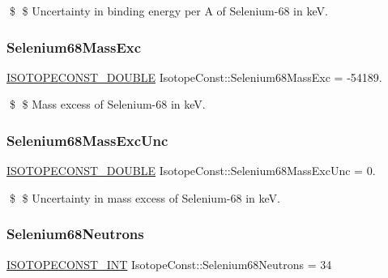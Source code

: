 \$ \$ Uncertainty in binding energy per A of Selenium-\/68 in keV. \mbox{\label{group___isotope_const-_selenium-_se68_ga8b3794abb817ae62775d8203038e5ab0}} 
\subsubsection{\texorpdfstring{Selenium68\+Mass\+Exc}{Selenium68MassExc}}
{\footnotesize\ttfamily \mbox{\hyperlink{group___isotope_const-_macros_ga8f45a7272ce02c0b4c65c44636ed719a}{I\+S\+O\+T\+O\+P\+E\+C\+O\+N\+S\+T\+\_\+\+D\+O\+U\+B\+LE}} Isotope\+Const\+::\+Selenium68\+Mass\+Exc = -\/54189.}

\$ \$ Mass excess of Selenium-\/68 in keV. \mbox{\label{group___isotope_const-_selenium-_se68_gaf2a722bd0616d2ed3c1ca0dd50732c0d}} 
\subsubsection{\texorpdfstring{Selenium68\+Mass\+Exc\+Unc}{Selenium68MassExcUnc}}
{\footnotesize\ttfamily \mbox{\hyperlink{group___isotope_const-_macros_ga8f45a7272ce02c0b4c65c44636ed719a}{I\+S\+O\+T\+O\+P\+E\+C\+O\+N\+S\+T\+\_\+\+D\+O\+U\+B\+LE}} Isotope\+Const\+::\+Selenium68\+Mass\+Exc\+Unc = 0.}

\$ \$ Uncertainty in mass excess of Selenium-\/68 in keV. \mbox{\label{group___isotope_const-_selenium-_se68_ga7d4707a4e7404c75e82249b72da73705}} 
\subsubsection{\texorpdfstring{Selenium68\+Neutrons}{Selenium68Neutrons}}
{\footnotesize\ttfamily \mbox{\hyperlink{group___isotope_const-_macros_ga5f18360b3e99483a35c32d789e62621c}{I\+S\+O\+T\+O\+P\+E\+C\+O\+N\+S\+T\+\_\+\+I\+NT}} Isotope\+Const\+::\+Selenium68\+Neutrons = 34}


